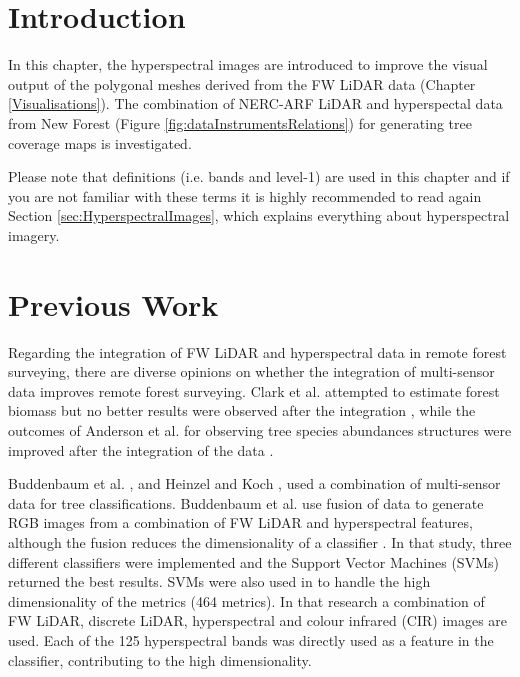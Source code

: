 \documentclass{subfiles}
\begin{document}
	
	\section{Introduction}	
	\par In this chapter, the hyperspectral images are introduced to improve the visual output of the polygonal meshes derived from the FW LiDAR data (Chapter \ref{Visualisations}).  The combination of NERC-ARF LiDAR and hyperspectal data from New Forest (Figure \ref{fig:dataInstrumentsRelations}) for generating tree coverage maps is investigated.
	
   {\color{blue} Please note that definitions (i.e. bands and level-1) are used in this chapter and if you are not familiar with these terms it is highly recommended to read again Section \ref{sec:HyperspectralImages}, which explains everything about hyperspectral imagery.}
	
	\section{Previous Work}
	
	\par Regarding the integration of FW LiDAR and hyperspectral data in remote forest surveying, there are diverse opinions on whether the integration of multi-sensor data improves remote forest surveying. Clark et al. attempted to estimate forest biomass but no better results were observed after the integration \cite{Clark2011}, while the outcomes of Anderson et al. for observing tree species abundances structures were improved after the integration of the data \cite{Anderson2008}. 
	
	\par  Buddenbaum et al. \cite{Buddenbaum2013}, and Heinzel and Koch \cite{Heinzel2012}, used a combination of multi-sensor data for tree classifications. Buddenbaum et al. use fusion of data to generate RGB images from a combination of FW LiDAR and hyperspectral features, although the fusion reduces the dimensionality of a classifier \cite{Buddenbaum2013}. In that study, three different classifiers were implemented and the Support Vector Machines (SVMs) returned the best results. SVMs were also used in \cite{Heinzel2012} to handle the high dimensionality of the metrics (464 metrics). In that research a combination of FW LiDAR, discrete LiDAR, hyperspectral and colour infrared (CIR) images are used. Each of the 125 hyperspectral bands was directly used as a feature in the classifier, contributing to the high dimensionality. 
 
\end{document}
